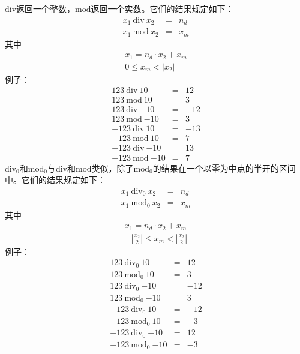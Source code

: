$\mathrm{div}$返回一个整数，$\mathrm{mod}$返回一个实数。它们的结果规定如下：
%
\begin{eqnarray*}
x_1~\mathrm{div}~x_2 &=& n_d\\
x_1~\mathrm{mod}~x_2 &=& x_m
\end{eqnarray*}
%
其中
%
\begin{displaymath}
\begin{array}{c}
x_1 = n_d \cdot x_2 + x_m\\
0 \leq x_m < |x_2|
\end{array}
\end{displaymath}
%
例子：
\begin{eqnarray*}
123~\mathrm{div}~10    &=&  12\\
123~\mathrm{mod}~10    &=&  3\\
123~\mathrm{div}~\textrm{$-10$}   &=&  -12\\
123~\mathrm{mod}~\textrm{$-10$}   &=&  3\\
-123~\mathrm{div}~10    &=&  -13\\
-123~\mathrm{mod}~10    &=&  7\\
-123~\mathrm{div}~\textrm{$-10$}   &=&  13\\
-123~\mathrm{mod}~\textrm{$-10$}   &=&  7
\end{eqnarray*}
%
$\mathrm{div}_0$和$\mathrm{mod}_0$与$\mathrm{div}$和$\mathrm{mod}$类似，除了$\mathrm{mod}_0$的结果在一个以零为中点的半开的区间中。它们的结果规定如下：
%
\begin{eqnarray*}
x_1~\mathrm{div}_0~x_2 &=& n_d\\
x_1~\mathrm{mod}_0~x_2 &=& x_m
\end{eqnarray*}
%
其中
%
\begin{displaymath}
\begin{array}{c}
x_1 = n_d \cdot x_2 + x_m\\
-|\frac{x_2}{2}| \leq x_m < |\frac{x_2}{2}|
\end{array}
\end{displaymath}
%
例子：
%
\begin{eqnarray*}
123~\mathrm{div}_0~10    &=&  12\\
123~\mathrm{mod}_0~10    &=&  3\\
123~\mathrm{div}_0~\textrm{$-10$}   &=&  -12\\
123~\mathrm{mod}_0~\textrm{$-10$}   &=&  3\\
-123~\mathrm{div}_0~10    &=&  -12\\
-123~\mathrm{mod}_0~10    &=&  -3\\
-123~\mathrm{div}_0~\textrm{$-10$}   &=&  12\\
-123~\mathrm{mod}_0~\textrm{$-10$}   &=&  -3
\end{eqnarray*}


